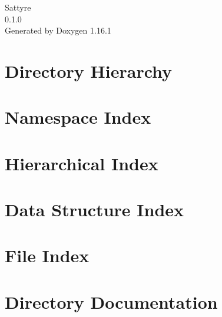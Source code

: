 \documentclass[twoside]{book}
\newcommand{\+}{\discretionary{\mbox{\scriptsize$\hookleftarrow$}}{}{}}
\newcommand{\clearemptydoublepage}{%
    \newpage{\pagestyle{empty}\cleardoublepage}%
  }
\begin{document}
  \raggedbottom
  \begin{titlepage}
  \vspace*{7cm}
  \begin{center}%
  {\Large Sattyre}\\
  [1ex]\large 0.\+1.\+0 \\
  \vspace*{1cm}
  {\large Generated by Doxygen 1.16.1}\\
  \end{center}
  \end{titlepage}
  \clearemptydoublepage
  \tableofcontents
  \clearemptydoublepage



\chapter{Directory Hierarchy}

\chapter{Namespace Index}

\chapter{Hierarchical Index}

\chapter{Data Structure Index}

\chapter{File Index}

\chapter{Directory Documentation}















\end{document}
